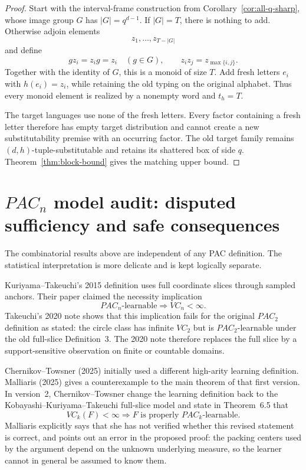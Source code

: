 \documentclass[11pt]{article}
\begin{document}
\begin{proof}
Start with the interval-frame construction from
Corollary~\ref{cor:all-q-sharp}, whose image group \(G\) has
\(|G|=q^{d-1}\). If \(|G|=T\), there is nothing to add.
Otherwise adjoin elements
\[
 z_1,\ldots,z_{T-|G|}
\]
and define
\[
 gz_i=z_i g=z_i\quad(g\in G),\qquad
 z_i z_j=z_{\max\{i,j\}}.
\]
Together with the identity of \(G\), this is a monoid of size \(T\).
Add fresh letters \(e_i\) with \(h(e_i)=z_i\), while retaining the old
typing on the original alphabet. Thus every monoid element is realized by a
nonempty word and \(t_h=T\).

The target languages use none of the fresh letters. Every factor containing
a fresh letter therefore has empty target distribution and cannot create a
new substitutability premise with an occurring factor. The old target family
remains \((d,h)\)-tuple-substitutable and retains its shattered box of
side \(q\). Theorem~\ref{thm:block-bound} gives the matching upper bound.
\end{proof}
\section{\(PAC_n\) model audit: disputed sufficiency and safe consequences}
\label{sec:pac-audit}

The combinatorial results above are independent of any PAC definition.  The
statistical interpretation is more delicate and is kept logically separate.

Kuriyama--Takeuchi's 2015 definition uses full coordinate slices through
sampled anchors.  Their paper claimed the necessity implication
\[
 PAC_n\text{-learnable}\Longrightarrow VC_n<\infty.
\]
Takeuchi's 2020 note shows that this implication fails for the original
\(PAC_2\) definition as stated: the circle class has infinite \(VC_2\) but is
\(PAC_2\)-learnable under the old full-slice Definition~3.  The 2020 note
therefore replaces the full slice by a support-sensitive observation on
finite or countable domains.

Chernikov--Towsner (2025) initially used a different high-arity learning
definition.  Malliaris (2025) gives a counterexample to the main theorem of
that first version.  In version~2, Chernikov--Towsner change the learning
definition back to the Kobayashi--Kuriyama--Takeuchi full-slice model and
state in Theorem~6.5 that
\[
 VC_k(F)<\infty
 \Longrightarrow
 F\text{ is properly }PAC_k\text{-learnable}.
\]
Malliaris explicitly says that she has not verified whether this revised
statement is correct, and points out an error in the proposed proof: the
packing centers used by the argument depend on the unknown underlying
measure, so the learner cannot in general be assumed to know them.
\end{document}
